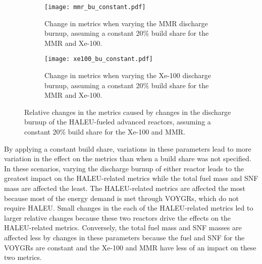 \begin{figure}[ht]
    \centering
    \begin{subfigure}{0.48\textwidth}
        \centering
        \texttt{[image: mmr\_bu\_constant.pdf]}
        \caption{Change in metrics when varying the MMR discharge burnup, 
        assuming a constant 20\% build share for the MMR and Xe-100.}
        \label{fig:mmr_bu_constant}
    \end{subfigure}
    \hfill
    \begin{subfigure}{0.48\textwidth}
        \centering
        \texttt{[image: xe100\_bu\_constant.pdf]}
        \caption{Change in metrics when varying the Xe-100 discharge burnup, 
        assuming a constant 20\% build share for the MMR and Xe-100.}
        \label{fig:xe100_bu_constant}
    \end{subfigure}
    \caption{Relative changes in the metrics caused by changes in the discharge 
    burnup of the HALEU-fueled advanced reactors, assuming a constant 
    20\% build share for the Xe-100 and MMR.}
    \label{fig:bu_constant}
\end{figure}

By applying a constant build share, variations in these parameters lead to 
more variation in the effect on the metrics than when a build share was not 
specified. In these scenarios, varying the discharge burnup of either reactor 
leads to the greatest impact on the \gls{HALEU}-related metrics while the  
total fuel mass and \gls{SNF} mass are affected the least. 
The \gls{HALEU}-related metrics are affected the most because most of the 
energy demand is met through VOYGRs, which do not require \gls{HALEU}. 
Small changes in the each of the \gls{HALEU}-related metrics led to larger 
relative changes because these two reactors drive the effects on the 
\gls{HALEU}-related metrics. Conversely, the total fuel mass and \gls{SNF} 
masses are affected less by changes in these parameters because the fuel 
and \gls{SNF} for the VOYGRs are constant and the Xe-100 and \gls{MMR} 
have less of an impact on these two metrics. 